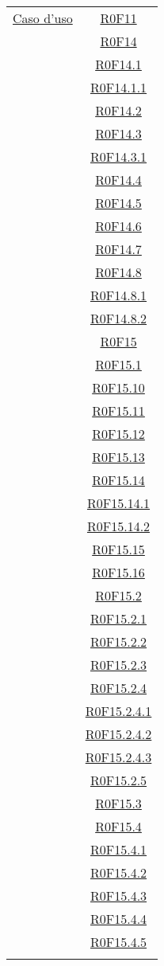 \documentclass[../AnalisiDeiRequisiti.tex]{subfiles}
\begin{document}
\begin{longtable}{|c|c|}
	\hyperlink{Caso d'uso}{Caso d'uso} & \hyperlink{R0F11}{R0F11}\\& \hyperlink{R0F14}{R0F14}\\& \hyperlink{R0F14.1}{R0F14.1}\\& \hyperlink{R0F14.1.1}{R0F14.1.1}\\& \hyperlink{R0F14.2}{R0F14.2}\\& \hyperlink{R0F14.3}{R0F14.3}\\& \hyperlink{R0F14.3.1}{R0F14.3.1}\\& \hyperlink{R0F14.4}{R0F14.4}\\& \hyperlink{R0F14.5}{R0F14.5}\\& \hyperlink{R0F14.6}{R0F14.6}\\& \hyperlink{R0F14.7}{R0F14.7}\\& \hyperlink{R0F14.8}{R0F14.8}\\& \hyperlink{R0F14.8.1}{R0F14.8.1}\\& \hyperlink{R0F14.8.2}{R0F14.8.2}\\& \hyperlink{R0F15}{R0F15}\\& \hyperlink{R0F15.1}{R0F15.1}\\& \hyperlink{R0F15.10}{R0F15.10}\\& \hyperlink{R0F15.11}{R0F15.11}\\& \hyperlink{R0F15.12}{R0F15.12}\\& \hyperlink{R0F15.13}{R0F15.13}\\& \hyperlink{R0F15.14}{R0F15.14}\\& \hyperlink{R0F15.14.1}{R0F15.14.1}\\& \hyperlink{R0F15.14.2}{R0F15.14.2}\\& \hyperlink{R0F15.15}{R0F15.15}\\& \hyperlink{R0F15.16}{R0F15.16}\\& \hyperlink{R0F15.2}{R0F15.2}\\& \hyperlink{R0F15.2.1}{R0F15.2.1}\\& \hyperlink{R0F15.2.2}{R0F15.2.2}\\& \hyperlink{R0F15.2.3}{R0F15.2.3}\\& \hyperlink{R0F15.2.4}{R0F15.2.4}\\& \hyperlink{R0F15.2.4.1}{R0F15.2.4.1}\\& \hyperlink{R0F15.2.4.2}{R0F15.2.4.2}\\& \hyperlink{R0F15.2.4.3}{R0F15.2.4.3}\\& \hyperlink{R0F15.2.5}{R0F15.2.5}\\& \hyperlink{R0F15.3}{R0F15.3}\\& \hyperlink{R0F15.4}{R0F15.4}\\& \hyperlink{R0F15.4.1}{R0F15.4.1}\\& \hyperlink{R0F15.4.2}{R0F15.4.2}\\& \hyperlink{R0F15.4.3}{R0F15.4.3}\\& \hyperlink{R0F15.4.4}{R0F15.4.4}\\& \hyperlink{R0F15.4.5}{R0F15.4.5}\\& 
\end{longtable}
\end{document}
